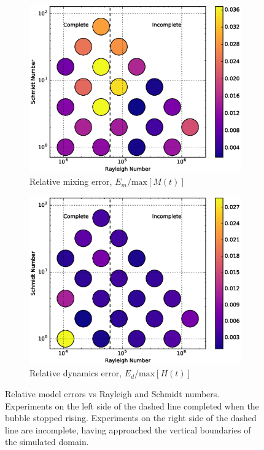 \begin{figure}
\begin{subfigure}[b]{\columnwidth}
\includegraphics[width=\columnwidth]{figs/MixingError-vs-Rayleigh-Schmidt}
\caption{Relative mixing error, $E_m/\text{max}[M(t)]$}
\end{subfigure}
\begin{subfigure}[b]{\columnwidth}
\includegraphics[width=\columnwidth]{figs/DynamicsError-vs-Rayleigh-Schmidt}
\caption{Relative dynamics error, $E_d/\text{max}[H(t)]$}
\end{subfigure}
\caption{ 
  Relative model errors vs Rayleigh and Schmidt numbers.
  Experiments on the left side of the dashed line completed when the bubble stopped rising.
  Experiments on the right side of the dashed line are incomplete, having approached the vertical boundaries of the simulated domain.
}
\end{figure}

